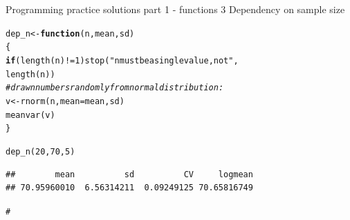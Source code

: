 \documentclass[xcolor=table,           xcolor=dvipsnames]{beamer}\usepackage[]{graphicx}\usepackage[]{color}
\makeatletter
\newcommand{\hlnum}[1]{\textcolor[rgb]{0,0,0}{#1}}
\newcommand{\hlstr}[1]{\textcolor[rgb]{0.545,0.137,0.137}{#1}}
\newcommand{\hlcom}[1]{\textcolor[rgb]{0,0.392,0}{\textit{#1}}}
\newcommand{\hlopt}[1]{\textcolor[rgb]{0,0,0}{#1}}
\newcommand{\hlstd}[1]{\textcolor[rgb]{0,0,0}{#1}}
\newcommand{\hlkwa}[1]{\textcolor[rgb]{1,0,0}{\textbf{#1}}}
\newcommand{\hlkwb}[1]{\textcolor[rgb]{0,0,0}{#1}}
\newcommand{\hlkwc}[1]{\textcolor[rgb]{1,0,1}{#1}}
\newcommand{\hlkwd}[1]{\textcolor[rgb]{0,0,1}{#1}}
\newenvironment{kframe}{%
 \def\at@end@of@kframe{}%
 \ifinner\ifhmode%
  \def\at@end@of@kframe{\end{minipage}}%
  \begin{minipage}{\columnwidth}%
 \fi\fi%
 \def\FrameCommand##1{\hskip\@totalleftmargin \hskip-\fboxsep
 \colorbox{shadecolor}{##1}\hskip-\fboxsep
     \hskip-\linewidth \hskip-\@totalleftmargin \hskip\columnwidth}%
 \MakeFramed {\advance\hsize-\width
   \@totalleftmargin\z@ \linewidth\hsize
   \@setminipage}}%
 {\par\unskip\endMakeFramed%
 \at@end@of@kframe}
\newenvironment{knitrout}{}{} %
\makeatother
\begin{document}
\begin{frame}[fragile]{Programming practice solutions part 1 - functions 3}
Dependency on sample size
\begin{knitrout}
\color{fgcolor}\begin{kframe}
\begin{alltt}
\hlstd{dep_n} \hlkwb{<-} \hlkwa{function}\hlstd{(}\hlkwc{n}\hlstd{,} \hlkwc{mean}\hlstd{,} \hlkwc{sd}\hlstd{)}
  \hlstd{\{}
  \hlkwa{if}\hlstd{(}\hlkwd{length}\hlstd{(n)}\hlopt{!=}\hlnum{1}\hlstd{)} \hlkwd{stop}\hlstd{(}\hlstr{"n must be a single value, not "}\hlstd{,}
                        \hlkwd{length}\hlstd{(n))}
  \hlcom{# draw n numbers randomly from normal distribution:}
  \hlstd{v} \hlkwb{<-} \hlkwd{rnorm}\hlstd{(n,} \hlkwc{mean}\hlstd{=mean, sd)}
  \hlkwd{meanvar}\hlstd{(v)}
  \hlstd{\}}

\hlkwd{dep_n}\hlstd{(}\hlnum{20}\hlstd{,} \hlnum{70}\hlstd{,}\hlnum{5}\hlstd{)}
\end{alltt}
\begin{verbatim}
##        mean          sd          CV     logmean 
## 70.95960010  6.56314211  0.09249125 70.65816749
\end{verbatim}
\begin{alltt}
\hlcom{#}
\end{alltt}
\end{kframe}
\end{knitrout}

\end{frame}

\end{document}

